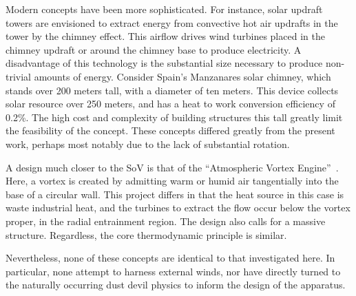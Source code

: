 %
%
Modern concepts have been more sophisticated. For instance, solar
updraft towers are envisioned to extract energy from convective hot air
updrafts in the tower by the chimney effect. This airflow drives wind
turbines placed in the chimney updraft or around the chimney base to
produce electricity. A disadvantage of this technology is the
substantial size necessary to produce non-trivial amounts of energy. 
%
%
Consider Spain's Manzanares solar chimney, which stands over 200 meters
tall, with a diameter of ten meters. This device collects solar
resource over 250 meters, and has a heat to work conversion efficiency
of 0.2\%\cite{schlaich2005design}. The high cost and complexity of
building structures this tall greatly limit the feasibility of the
concept. These concepts differed greatly from the present work, perhaps
most notably due to the lack of substantial rotation. 

%
%
A design much closer to the SoV is that of the ``Atmospheric Vortex
Engine''~\cite{vortex_engine,michaud2006atmospheric}. Here, a vortex is
created by admitting warm or humid air tangentially into the base of a
circular wall. This project differs in that the heat source in this case
is waste industrial heat, and the turbines to extract
the flow occur below the vortex proper, in the radial entrainment
region. The design also calls for a massive structure. Regardless, the
core thermodynamic principle is similar.   

Nevertheless, none of these concepts are identical to that investigated
here. In particular, none attempt to harness external winds, nor have
directly turned to the naturally occurring dust devil physics to inform
the design of the apparatus.  

%
%
%
%
%
%
%
%
